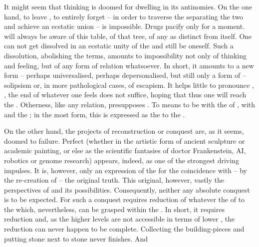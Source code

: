 It might seem that  thinking is doomed for dwelling in
its antinomies. On the one hand, to leave , to entirely forget
 -- in order to traverse the  separating the two and
achieve an ecstatic union -- is impossible. Drugs
pacify only for a moment.  will always be aware
of this table, of that tree, of any  as distinct from itself.
One can not get dissolved in an ecstatic unity of the  and still
be oneself. Such a dissolution, abolishing the  terms, amounts to
impossibility not only of thinking and feeling, but of any form of relation
whatsoever. In short, it amounts to a new form -- perhaps universalised, perhaps
depersonalised, but still only a form of -- solipsism or, in more pathological
cases, of escapism. It helps little to pronounce ,
, the end of whatever one feels does not
suffice, hoping that thus one will reach the . Otherness, like
any relation, presupposes . To  means to be
 with the  
of , with  and the ; in the most 
form, this  is expressed as the  to
the . 

On the other hand, the projects of  reconstruction or conquest
are, as it seems, doomed to failure. Perfect  (whether in the
artistic form of ancient sculpture or academic painting, or else as the
scientific fantasies of doctor Frankenstein, AI, robotics or genome research)
appears, indeed, as one of the strongest driving impulses. It is, however, only
an expression of the  for the coincidence with -- by the
re-creation of -- the original truth. This original, however, vastly
 the perspectives of  and its
possibilities. Consequently,
neither any absolute conquest is to be expected. For such a conquest requires
reduction of whatever  the  of  to
the  which, nevertheless, can be grasped within the \hoa. In short, it
requires reduction and, as the higher levels are not accessible in terms of
lower , the reduction can never happen to be complete.
Collecting the building-pieces and putting stone next to stone never finishes.
And 

